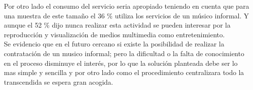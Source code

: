 Por otro lado el consumo del servicio seria apropiado teniendo en cuenta que para una muestra de este tamaño el 36 \% utiliza los servicios de un músico informal. Y aunque el 52 \% dijo nunca realizar esta actividad se pueden interesar por la reproducción y visualización de medios multimedia como entretenimiento.\\
Se evidencio que en el futuro cercano si existe la posibilidad de realizar la contratación de un musico informal; pero la dificultad o la falta de conocimiento en el proceso disminuye el interés, por lo que la solución planteada debe ser lo mas simple y sencilla y por otro lado como el procedimiento centralizara todo la transcendida se espera gran acogida.
